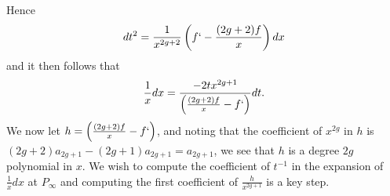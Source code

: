 \documentclass[draft, 11pt]{article} %
\theoremstyle{plain}
\theoremstyle{remark}
\begin{document}
\begin{comment}
So if we write $h(x) = \sum_{i\geq 4} c_i t^i$ then we must have $c_4 = \frac{a_{2g}}{a_{2g+1}^2}$ in order that the coefficients of $\frac{1}{x^2}$ are equal.

We now compute the $c_6$ expansions of $h(x)$.

We know that the lead term of $t^6 = \frac{f(x)^3}{x^{6g+6}}$ is $\frac{2a_{2g}^2}{a_{2g+1}x^3}$.
So $c_6$ must satisfy
\[
\frac{2a_{2g-1}}{x^3} = \frac{c_4\cdot 2 \cdot a_{2g} \cdot a_{2g+1}}{x^3} + \frac{c_6 \cdot a_{2g+1}^3}{x^3},
\]
from \eqref{h(x)} and \eqref{t^4}.

Hence we can easily derive $c_6 = \frac{2\cdot a_{2g-1} \cdot a_{2g+1} - 2a_{2g}^2}{a_{2g+1}^4}$.


We then suppose that $\frac{1}{h}  = \sum_{i\geq -4} d_it^i$, and then we have $\sum c_it^i \cdot \sum d_it^i = 1$.
As described earlier we want to compute $d_{-2}$.
Expanding the product of the sums we see
\[
1 = c_4\cdot d_{-4} + (c_6\cdot d_{-4} + c_4\cdot d_{-2})t^2 + \ldots
\]
So $c_4 \cdot d_{-4} = 1$ and hence $d_{-4} = \frac{1}{c_4}$.



Then we also have $c_6d_{-4} + c_4d_{-2} = 0$ and hence $d_{-2} = -\frac{c_6d_{-4}}{c_4} = -\frac{c_6}{c_4}$.
So in total  
\[
d_{-2} = \frac{a_{2g+1}^4}{a_{2g}^2} \cdot \left( \frac{2a_{2g-1}a_{2g+1} - 2a_{2g}^2}{a_{2g+1}^4} \right) = \frac{2a_{2g-1}a_{2g+1} - 2a_{2g}^2}{a_{2g}^2}.
\]

Now we can assume that $a_{2g+1} = 1$, since this will not affect the curve.
This reduces the task of showing that the residue is non-zero to showing that $a_{2g-1} -a_{2g}^2 \neq 0$.
But if we write the roots of $f(x)$ as $\alpha_i \in k$ with $1\leq i \leq 2g+1$ then we can see that $a_{2g-1} -a_{2g}^2 = \sum_{i=1}^{2g+1}\alpha_i^2$.
 
{\bf If this sum is zero, then by an automorphism of the curve we can change one of the roots by a small value, and hence make it non-zero. 
Indeed, we can fix all but one root, say $\alpha_1$. Then there is only one value of $\alpha_1$ such that $a_{2g}=0$, and there are only two values of $\alpha_1$ such that $\sum_{i=1}^{2g+1}\alpha_i^2 = 0$. Since $k$ is infinite we can certainly ensure that our automorphism of $X$ sends $\alpha_1$ to an element of $k$ distinct from these three values.}
\end{comment}

Hence
\[
dt^2 = \frac{1}{x^{2g+2}}\left(f` - \frac{(2g+2)f}{x}\right) dx
\]
and it then follows that
\[
\frac{1}{x}dx = \frac{-2tx^{2g+1}}{\left(\frac{(2g+2)f}{x} - f`\right)} dt.
\]
We now let $h = \left(\frac{(2g+2)f}{x} - f`\right)$, and noting that the coefficient of $x^{2g}$ in $h$ is $(2g+2)a_{2g+1} - (2g+1)a_{2g+1} = a_{2g+1}$, we see that $h$ is a degree $2g$ polynomial in $x$.
We wish to compute the coefficient of $t^{-1}$ in the expansion of $\frac{1}{x}dx$ at $P_\infty$ and computing the first coefficient of $\frac{h}{x^{2g+1}}$ is a key step.
\end{document}
